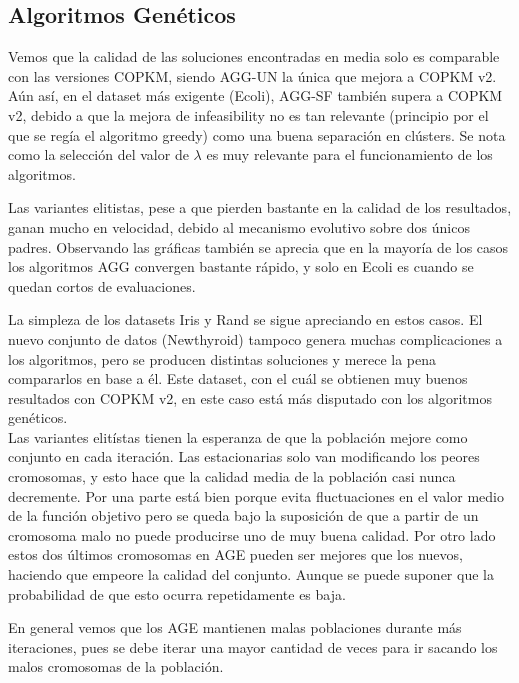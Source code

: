 \subsection{Algoritmos Genéticos}

Vemos que la calidad de las soluciones encontradas en media solo es comparable con las versiones COPKM, siendo AGG-UN la única que mejora a COPKM v2. Aún así, en el dataset más exigente (Ecoli), AGG-SF también supera a COPKM v2, debido a que la mejora de infeasibility no es tan relevante (principio por el que se regía el algoritmo greedy) como una buena separación en clústers. Se nota como la selección del valor de $\lambda$ es muy relevante para el funcionamiento de los algoritmos.

Las variantes elitistas, pese a que pierden bastante en la calidad de los resultados, ganan mucho en velocidad, debido al mecanismo evolutivo sobre dos únicos padres.
Observando las gráficas también se aprecia que en la mayoría de los casos los algoritmos AGG convergen bastante rápido, y solo en Ecoli es cuando se quedan cortos de evaluaciones.

La simpleza de los datasets Iris y Rand se sigue apreciando en estos casos. El nuevo conjunto de datos (Newthyroid) tampoco genera muchas complicaciones a los algoritmos, pero se producen distintas soluciones y merece la pena compararlos en base a él. Este dataset, con el cuál se obtienen muy buenos resultados con COPKM v2, en este caso está más disputado con los algoritmos genéticos. \\

Las variantes elitístas tienen la esperanza de que la población mejore como conjunto en cada iteración. Las estacionarias solo van modificando los peores cromosomas, y esto hace que la calidad media de la población casi nunca decremente. Por una parte está bien porque evita fluctuaciones en el valor medio de la función objetivo pero se queda bajo la suposición de que a partir de un cromosoma malo no puede producirse uno de muy buena calidad.
Por otro lado estos dos últimos cromosomas en AGE pueden ser mejores que los nuevos, haciendo que empeore la calidad del conjunto. Aunque se puede suponer que la probabilidad de que esto ocurra repetidamente es baja.

En general vemos que los AGE mantienen malas poblaciones durante más iteraciones, pues se debe iterar una mayor cantidad de veces para ir sacando los malos cromosomas de la población. \\

